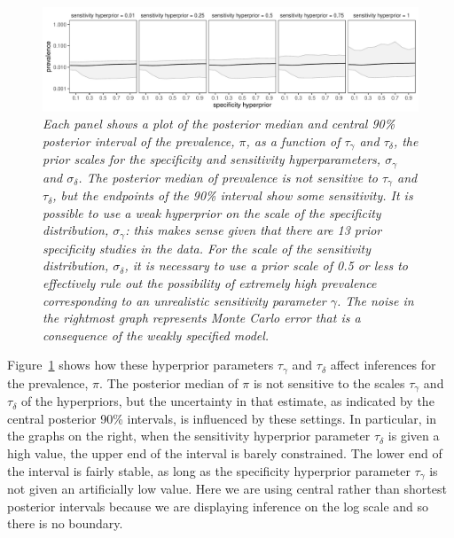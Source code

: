 \documentclass[11pt]{article}
\begin{document}
\begin{figure}
  \centerline{\includegraphics[width=\textwidth]{prior-sensitivity-2.pdf}}
  \vspace{-.15in}
\caption{\em Each panel shows a plot of the posterior median and central 90\%
  posterior interval of the prevalence, $\pi$, as a function of $\tau_{\gamma}$ and $\tau_{\delta}$, the prior scales for the specificity  and sensitivity
  hyperparameters, $\sigma_{\gamma}$ and $\sigma_{\delta}$.
  The posterior median of prevalence is not sensitive to $\tau_{\gamma}$ and $\tau_{\delta}$, but the endpoints of the 90\% interval show some sensitivity.  It is possible to use a weak hyperprior on the scale of the specificity distribution,  $\sigma_{\gamma}$:  this makes sense given that there are 13 prior specificity studies in the data.  For the scale of the sensitivity distribution,  $\sigma_{\delta}$, it is necessary to use a prior scale of 0.5 or less to effectively rule out the possibility of extremely high prevalence  corresponding to an unrealistic sensitivity parameter $\gamma$.  The noise in the rightmost graph represents Monte Carlo error that is a consequence of the weakly specified model.}\label{prior-sensitivity.fig}
\end{figure}

Figure~\ref{prior-sensitivity.fig} shows how these hyperprior parameters $\tau_{\gamma}$ and $\tau_{\delta}$ affect inferences for the prevalence, $\pi$.  
The posterior median of $\pi$ is not sensitive to the scales
 $\tau_{\gamma}$ and $\tau_{\delta}$ of the hyperpriors, but the
uncertainty in that estimate, as indicated by the central posterior 90\%
intervals, is influenced by these settings.  In particular, in the graphs on the right, when the sensitivity hyperprior parameter $\tau_{\delta}$ is given a high value, the upper end of the interval is barely constrained.  The lower end of the interval is fairly stable, as long as the specificity hyperprior parameter $\tau_{\gamma}$ is not given an artificially low value. Here we are using central rather than shortest posterior intervals because we are displaying inference on the log scale and so there is no boundary.
\end{document}
